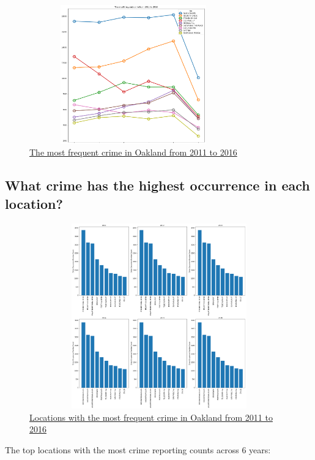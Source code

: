 \documentclass{article} %
\begin{document}
\begin{figure}[H]
	\begin{center}
		\includegraphics[height=6cm, width=9cm]{1.png}
	\end{center}
	\caption{\hyperref[appendix:plot1]{The most frequent crime in Oakland from 2011 to 2016}}
\end{figure}


\subsection{What crime has the highest occurrence in each location?}


\begin{figure}[H]
	\begin{center}
		\includegraphics[height=8cm, width=15cm]{2.png}
	\end{center}
	\caption{\hyperref[appendix:plot1]{Locations with the most frequent crime in Oakland from 2011 to 2016}}
\end{figure}

The top locations with the most crime reporting counts across 6 years:
\end{document}
